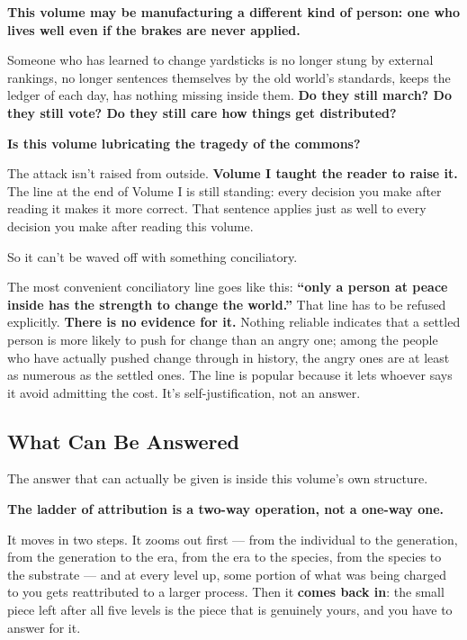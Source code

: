 \documentclass[11pt,a4paper]{article}
\begin{document}
\textbf{This volume may be manufacturing a different kind of person: one who lives well even if the brakes are never applied.}

Someone who has learned to change yardsticks is no longer stung by external rankings, no longer sentences themselves by the old world's standards, keeps the ledger of each day, has nothing missing inside them. \textbf{Do they still march? Do they still vote? Do they still care how things get distributed?}

\textbf{Is this volume lubricating the tragedy of the commons?}

The attack isn't raised from outside. \textbf{Volume I taught the reader to raise it.} The line at the end of Volume I is still standing: every decision you make after reading it makes it more correct. That sentence applies just as well to every decision you make after reading this volume.

So it can't be waved off with something conciliatory.

The most convenient conciliatory line goes like this: \textbf{``only a person at peace inside has the strength to change the world.''} That line has to be refused explicitly. \textbf{There is no evidence for it.} Nothing reliable indicates that a settled person is more likely to push for change than an angry one; among the people who have actually pushed change through in history, the angry ones are at least as numerous as the settled ones. The line is popular because it lets whoever says it avoid admitting the cost. It's self-justification, not an answer.

\subsection{What Can Be Answered}

The answer that can actually be given is inside this volume's own structure.

\textbf{The ladder of attribution is a two-way operation, not a one-way one.}

It moves in two steps. It zooms out first --- from the individual to the generation, from the generation to the era, from the era to the species, from the species to the substrate --- and at every level up, some portion of what was being charged to you gets reattributed to a larger process. Then it \textbf{comes back in}: the small piece left after all five levels is the piece that is genuinely yours, and you have to answer for it.
\end{document}

